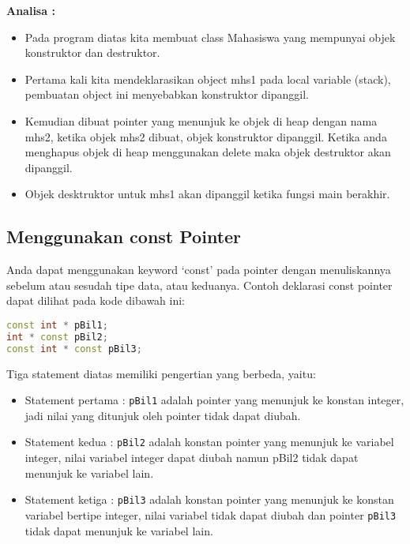 \textbf{Analisa :}

\begin{itemize}
\tightlist
\item
  Pada program diatas kita membuat class Mahasiswa yang mempunyai objek
  konstruktor dan destruktor.
\item
  Pertama kali kita mendeklarasikan object mhs1 pada local variable
  (stack), pembuatan object ini menyebabkan konstruktor dipanggil.
\item
  Kemudian dibuat pointer yang menunjuk ke objek di heap dengan nama
  mhs2, ketika objek mhs2 dibuat, objek konstruktor dipanggil. Ketika
  anda menghapus objek di heap menggunakan delete maka objek destruktor
  akan dipanggil.
\item
  Objek desktruktor untuk mhs1 akan dipanggil ketika fungsi main
  berakhir.
\end{itemize}

\subsection{Menggunakan const Pointer}\label{menggunakan-const-pointer}

Anda dapat menggunakan keyword `const' pada pointer dengan menuliskannya
sebelum atau sesudah tipe data, atau keduanya. Contoh deklarasi const
pointer dapat dilihat pada kode dibawah ini:

\begin{lstlisting}[language=c++, numbers=none]
const int * pBil1;
int * const pBil2;
const int * const pBil3;
\end{lstlisting}

Tiga statement diatas memiliki pengertian yang berbeda, yaitu:

\begin{itemize}
\tightlist
\item
  Statement pertama : \texttt{pBil1} adalah pointer yang menunjuk ke
  konstan integer, jadi nilai yang ditunjuk oleh pointer tidak dapat
  diubah.
\item
  Statement kedua : \texttt{pBil2} adalah konstan pointer yang menunjuk
  ke variabel integer, nilai variabel integer dapat diubah namun pBil2
  tidak dapat menunjuk ke variabel lain.
\item
  Statement ketiga : \texttt{pBil3} adalah konstan pointer yang menunjuk
  ke konstan variabel bertipe integer, nilai variabel tidak dapat diubah
  dan pointer \texttt{pBil3} tidak dapat menunjuk ke variabel lain.
\end{itemize}

